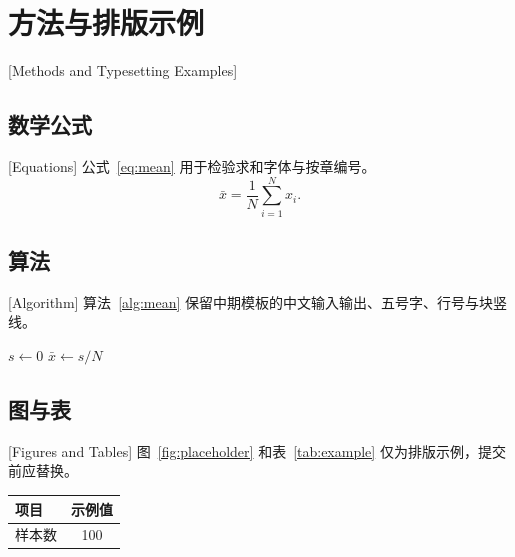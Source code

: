 \chapter{方法与排版示例}[Methods and Typesetting Examples]
\section{数学公式}[Equations]
公式~\ref{eq:mean} 用于检验求和字体与按章编号。
\begin{equation}
  \bar x = \frac{1}{N}\sum_{i=1}^{N}x_i .
  \label{eq:mean}
\end{equation}
\section{算法}[Algorithm]
算法~\ref{alg:mean} 保留中期模板的中文输入输出、五号字、行号与块竖线。
\begin{algorithm}[htbp]
\caption{样本均值计算示例}\label{alg:mean}
$s\gets0$\;
$\bar x\gets s/N$\;
\end{algorithm}
\section{图与表}[Figures and Tables]
图~\ref{fig:placeholder} 和表~\ref{tab:example} 仅为排版示例，提交前应替换。
\begin{figure}[htbp]
\centering
{}
\end{figure}
\begin{table}[htbp]
\centering
{}
\begin{tabular}{lc}
\toprule
项目 & 示例值 \\
\midrule
样本数 & 100 \\
\bottomrule
\end{tabular}
\end{table}
